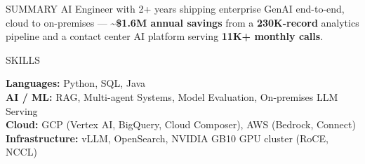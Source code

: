 \documentclass{resume} %
\begin{document}
\begin{rSection}{SUMMARY}
AI Engineer with 2+ years shipping enterprise GenAI end-to-end, cloud to on-premises --- \textbf{\textasciitilde\$1.6M annual savings} from a \textbf{230K-record} analytics pipeline and a contact center AI platform serving \textbf{11K+ monthly calls}.
\end{rSection}

\begin{rSection}{SKILLS}

\textbf{Languages:} Python, SQL, Java \\
\textbf{AI / ML:} RAG, Multi-agent Systems, Model Evaluation, On-premises LLM Serving \\
\textbf{Cloud:} GCP (Vertex AI, BigQuery, Cloud Composer), AWS (Bedrock, Connect) \\
\textbf{Infrastructure:} vLLM, OpenSearch, NVIDIA GB10 GPU cluster (RoCE, NCCL)

\end{rSection}
\end{document}
